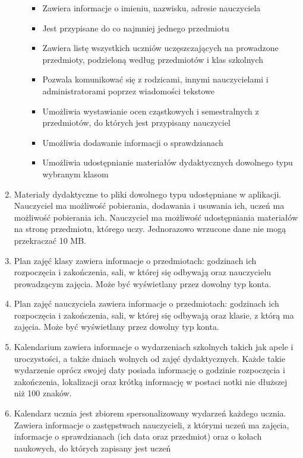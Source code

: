 \documentclass{article}
\begin{document}
\begin{enumerate}
\begin{itemize}
\begin{itemize}
            \item Zawiera informacje o imieniu, nazwisku, adresie nauczyciela
            \item Jest przypisane do co najmniej jednego przedmiotu
            \item Zawiera listę wszystkich uczniów uczęszczających na prowadzone przedmioty, podzieloną według przedmiotów i klas szkolnych
            \item Pozwala komunikować się z rodzicami, innymi nauczycielami i administratorami poprzez wiadomości tekstowe
            \item Umożliwia wystawianie ocen cząstkowych i semestralnych z przedmiotów, do których jest przypisany nauczyciel
            \item Umożliwia dodawanie informacji o sprawdzianach
            \item Umożliwia udostępnianie materiałów dydaktycznych dowolnego typu wybranym klasom
        \end{itemize}
    \end{itemize}
    \item Materiały dydaktyczne to pliki dowolnego typu udostępniane w aplikacji. Nauczyciel ma możliwość pobierania, dodawania i usuwania ich, uczeń ma możliwość pobierania ich. Nauczyciel ma możliwość udostępniania materiałów na stronę przedmiotu, którego uczy. Jednorazowo wrzucone dane nie mogą przekraczać 10 MB.
    \item Plan zajęć klasy zawiera informacje o przedmiotach: godzinach ich rozpoczęcia i zakończenia, sali, w której się odbywają oraz nauczycielu prowadzącym zajęcia. Może być wyświetlany przez dowolny typ konta.
    \item Plan zajęć nauczyciela zawiera informacje o przedmiotach: godzinach ich rozpoczęcia i zakończenia, sali, w której się odbywają oraz klasie, z którą ma zajęcia. Może być wyświetlany przez dowolny typ konta.
    \item Kalendarium zawiera informacje o wydarzeniach szkolnych takich jak apele i uroczystości, a także dniach wolnych od zajęć dydaktycznych. Każde takie wydarzenie oprócz swojej daty posiada informację o godzinie rozpoczęcia i zakończenia, lokalizacji oraz krótką informację w postaci notki nie dłuższej niż 100 znaków.
    \item Kalendarz ucznia jest zbiorem spersonalizowany wydarzeń każdego ucznia. Zawiera informacje o zastępstwach nauczycieli, z którymi uczeń ma zajęcia, informacje o sprawdzianach (ich data oraz przedmiot) oraz o kołach naukowych, do których zapisany jest uczeń

\end{enumerate}
\end{document}
